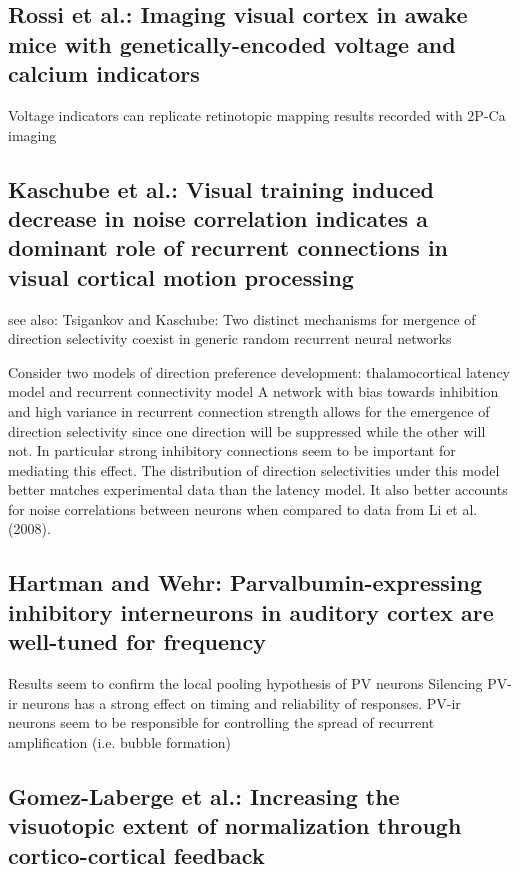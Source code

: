 \documentclass[11pt]{Science}
\begin{document}
\subsection{Rossi et al.: Imaging visual cortex in awake mice with genetically-encoded voltage and calcium indicators}
\label{sec-2.5}


Voltage indicators can replicate retinotopic mapping results recorded with 2P-Ca imaging

\subsection{Kaschube et al.: Visual training induced decrease in noise correlation indicates a  dominant role of recurrent connections in visual cortical motion processing}
\label{sec-2.6}


see also: Tsigankov and Kaschube: Two distinct mechanisms for mergence of direction selectivity coexist in generic random recurrent neural networks

Consider two models of direction preference development: thalamocortical latency model and recurrent connectivity model
A network with bias towards inhibition and high variance in recurrent connection strength allows for the emergence of direction selectivity since one direction will be suppressed while the other will not. In particular strong inhibitory connections seem to be important for mediating this effect. The distribution of direction selectivities under this model better matches experimental data than the latency model. It also better accounts for noise correlations between neurons when compared to data from Li et al. (2008).

\subsection{Hartman and Wehr: Parvalbumin-expressing inhibitory interneurons in auditory cortex are well-tuned for frequency}
\label{sec-2.7}


Results seem to confirm the local pooling hypothesis of PV neurons
Silencing PV-ir neurons has a strong effect on timing and reliability of responses.
PV-ir neurons seem to be responsible for controlling the spread of recurrent amplification (i.e. bubble formation)

\subsection{Gomez-Laberge et al.: Increasing the visuotopic extent of normalization through cortico-cortical feedback}
\label{sec-2.8}
\end{document}
